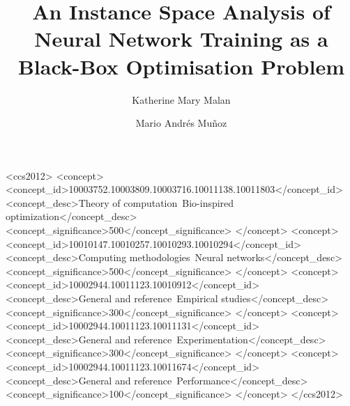 \documentclass[acmsmall,screen,review,anonymous]{acmart}
\begin{document}

\title{An Instance Space Analysis of Neural Network Training as a Black-Box Optimisation Problem}

\author{Katherine Mary Malan}
 
\author{Mario Andrés Muñoz}

\begin{CCSXML}
<ccs2012>
   <concept>
       <concept_id>10003752.10003809.10003716.10011138.10011803</concept_id>
       <concept_desc>Theory of computation~Bio-inspired optimization</concept_desc>
       <concept_significance>500</concept_significance>
       </concept>
   <concept>
       <concept_id>10010147.10010257.10010293.10010294</concept_id>
       <concept_desc>Computing methodologies~Neural networks</concept_desc>
       <concept_significance>500</concept_significance>
       </concept>
   <concept>
       <concept_id>10002944.10011123.10010912</concept_id>
       <concept_desc>General and reference~Empirical studies</concept_desc>
       <concept_significance>300</concept_significance>
       </concept>
   <concept>
       <concept_id>10002944.10011123.10011131</concept_id>
       <concept_desc>General and reference~Experimentation</concept_desc>
       <concept_significance>300</concept_significance>
       </concept>
   <concept>
       <concept_id>10002944.10011123.10011674</concept_id>
       <concept_desc>General and reference~Performance</concept_desc>
       <concept_significance>100</concept_significance>
       </concept>
 </ccs2012>
\end{CCSXML}

\end{document}
